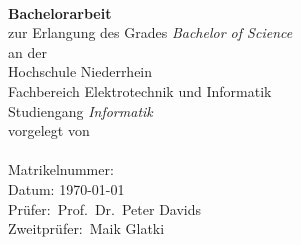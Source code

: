 
\begin{titlepage}

\begin{center}
{\Large\bf \@title}\\[3cm]



{\bf Bachelorarbeit}\\
zur Erlangung des Grades {\em Bachelor of Science}\\[1.5cm]

an der\\
Hochschule Niederrhein\\
Fachbereich Elektrotechnik und Informatik\\
Studiengang {\em Informatik}\\[3cm]

vorgelegt von\\
\@author\\
Matrikelnummer: \Matrikelnummer\\[3cm]
Datum: \today\\[3cm]

Prüfer:~Prof.~Dr.~Peter Davids
\\Zweitprüfer:~Maik Glatki

\end{center}
\end{titlepage}

\pagestyle{empty}
\cleardoublepage
